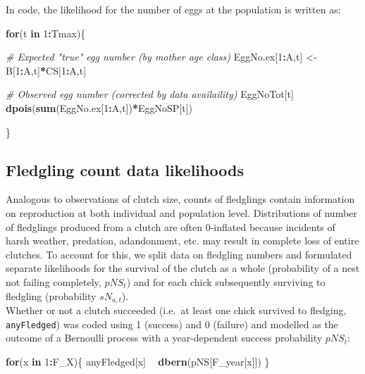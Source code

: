 \documentclass[
]{book}
\newenvironment{Shaded}{\begin{snugshade}}{\end{snugshade}}
\newcommand{\CommentTok}[1]{\textcolor[rgb]{0.56,0.35,0.01}{\textit{#1}}}
\newcommand{\ControlFlowTok}[1]{\textcolor[rgb]{0.13,0.29,0.53}{\textbf{#1}}}
\newcommand{\DecValTok}[1]{\textcolor[rgb]{0.00,0.00,0.81}{#1}}
\newcommand{\KeywordTok}[1]{\textcolor[rgb]{0.13,0.29,0.53}{\textbf{#1}}}
\newcommand{\NormalTok}[1]{#1}
\newcommand{\OperatorTok}[1]{\textcolor[rgb]{0.81,0.36,0.00}{\textbf{#1}}}
\newcommand{\StringTok}[1]{\textcolor[rgb]{0.31,0.60,0.02}{#1}}
\begin{document}
In code, the likelihood for the number of eggs at the population is written as:

\begin{Shaded}
\begin{Highlighting}[]
\ControlFlowTok{for}\NormalTok{(t }\ControlFlowTok{in} \DecValTok{1}\OperatorTok{:}\NormalTok{Tmax)\{}

    \CommentTok{# Expected "true" egg number (by mother age class)}
\NormalTok{    EggNo.ex[}\DecValTok{1}\OperatorTok{:}\NormalTok{A,t] <-}\StringTok{ }\NormalTok{B[}\DecValTok{1}\OperatorTok{:}\NormalTok{A,t]}\OperatorTok{*}\NormalTok{CS[}\DecValTok{1}\OperatorTok{:}\NormalTok{A,t]}

    \CommentTok{# Observed egg number (corrected by data availaility)}
\NormalTok{    EggNoTot[t] }\OperatorTok{~}\StringTok{ }\KeywordTok{dpois}\NormalTok{(}\KeywordTok{sum}\NormalTok{(EggNo.ex[}\DecValTok{1}\OperatorTok{:}\NormalTok{A,t])}\OperatorTok{*}\NormalTok{EggNoSP[t])}

\NormalTok{\}}
\end{Highlighting}
\end{Shaded}

\hypertarget{fledgling-count-data-likelihoods}{%
\subsection{Fledgling count data likelihoods}\label{fledgling-count-data-likelihoods}}

Analogous to observations of clutch size, counts of fledglings contain
information on reproduction at both individual and population level.
Distributions of number of fledglings produced from a clutch are often 0-inflated
because incidents of harsh weather, predation, adandonment, etc. may result in
complete loss of entire clutches. To account for this, we split data on fledgling
numbers and formulated separate likelihoods for the survival of the clutch as
a whole (probability of a nest not failing completely, \(pNS_t\)) and for each
chick subsequently surviving to fledgling (probability \(sN_{a,t}\)).\\
Whether or not a clutch succeeded (i.e.~at least one chick survived to fledging,
\texttt{anyFledged}) was coded using 1 (success) and 0 (failure) and modelled as the
outcome of a Bernoulli process with a year-dependent success probability \(pNS_t\):

\begin{Shaded}
\begin{Highlighting}[]
\ControlFlowTok{for}\NormalTok{(x }\ControlFlowTok{in} \DecValTok{1}\OperatorTok{:}\NormalTok{F_X)\{}
\NormalTok{  anyFledged[x] }\OperatorTok{~}\StringTok{ }\KeywordTok{dbern}\NormalTok{(pNS[F_year[x]])}
\NormalTok{\}}
\end{Highlighting}
\end{Shaded}
\end{document}
